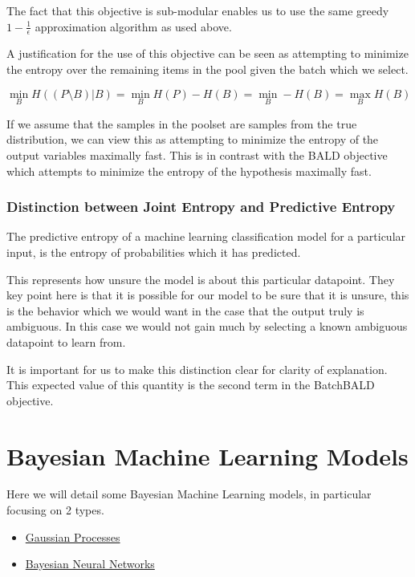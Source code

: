 \documentclass[12pt, a4paper]{report}
\theoremstyle{definition}
\theoremstyle{definition}
\theoremstyle{definition}
\begin{document}
The fact that this objective is sub-modular enables us to use the same greedy $1 - \frac{1}{\epsilon}$ approximation algorithm as used above.

A justification for the use of this objective can be seen as attempting to minimize the entropy over the remaining items in the pool given the batch which we select.


$$\min_{B} H( \left(P \setminus B\right) | B) = \min_{B} H(P) - H(B) = \min_{B} - H(B) = \max_B H(B)$$

If we assume that the samples in the poolset are samples from the true distribution, we can view this as attempting to minimize the entropy of the output variables maximally fast. This is in contrast with the BALD objective which attempts to minimize the entropy of the hypothesis maximally fast.

\subsection{Distinction between Joint Entropy and Predictive Entropy}

The predictive entropy of a machine learning classification model for a particular input, is the entropy of probabilities which it has predicted. 

This represents how unsure the model is about this particular datapoint. They key point here is that it is possible for our model to be sure that it is unsure, this is the behavior which we would want in the case that the output truly is ambiguous. In this case we would not gain much by selecting a known ambiguous datapoint to learn from.

It is important for us to make this distinction clear for clarity of explanation. This expected value of this quantity is the second term in the BatchBALD objective.

\chapter{Bayesian Machine Learning Models}
\label{sec:Models}


Here we will detail some Bayesian Machine Learning models, in particular focusing on 2 types.

\begin{itemize}
    \item \hyperref[sec:GaussianProcesses]{Gaussian Processes}
    \item \hyperref[sec:BNNs]{Bayesian Neural Networks}
\end{itemize}
\end{document}
